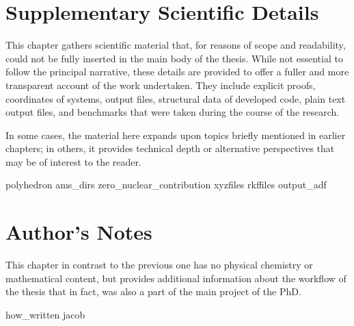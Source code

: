 \appendix
\renewcommand{\thetable}{SI\arabic{table}}%

\chapter{Supplementary Scientific Details}

This chapter gathers scientific material that, for reasons of scope and
readability, could not be fully inserted in the main body of the thesis. While
not essential to follow the principal narrative, these details are provided to
offer a fuller and more transparent account of the work undertaken. They
include explicit proofs, coordinates of systems, output files, structural data
of developed code, plain text output files, and benchmarks that were taken
during the course of the research.

In some cases, the material here expands upon topics
briefly mentioned in earlier chapters; in others, it provides technical depth
or alternative perspectives that may be of interest to the reader.

{polyhedron}
{ams_dirs}
{zero_nuclear_contribution}
{xyzfiles}
{rkffiles}
{output_adf}

\chapter{Author's Notes}

This chapter in contrast to the previous one has no physical chemistry or
mathematical content, but provides additional information about the workflow of
the thesis that in fact, was also a part of the main project of the PhD.

{how_written}
{jacob}

